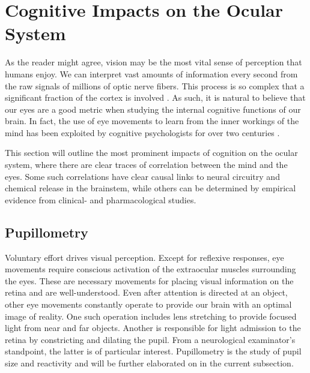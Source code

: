 \section{Cognitive Impacts on the Ocular System} \label{sec:bt/cognitive_impacts}

As the reader might agree, vision may be the most vital sense of perception that humans enjoy. We can interpret vast amounts of information every second from the raw signals of millions of optic nerve fibers. This process is so complex that a significant fraction of the cortex is involved \cite{klatzky2012}. As such, it is natural to believe that our eyes are a good metric when studying the internal cognitive functions of our brain. In fact, the use of eye movements to learn from the inner workings of the mind has been exploited by cognitive psychologists for over two centuries \cite{wells1792}. 

This section will outline the most prominent impacts of cognition on the ocular system, where there are clear traces of correlation between the mind and the eyes. Some such correlations have clear causal links to neural circuitry and chemical release in the brainstem, while others can be determined by empirical evidence from clinical- and pharmacological studies.


\subsection{Pupillometry} \label{sec:bt/cognitive_impacts/pupillometry}

Voluntary effort drives visual perception. Except for reflexive responses, eye movements require conscious activation of the extraocular muscles surrounding the eyes. These are necessary movements for placing visual information on the retina and are well-understood. Even after attention is directed at an object, other eye movements constantly operate to provide our brain with an optimal image of reality. One such operation includes lens stretching to provide focused light from near and far objects. Another is responsible for light admission to the retina by constricting and dilating the pupil. From a neurological examinator's standpoint, the latter is of particular interest. Pupillometry is the study of pupil size and reactivity and will be further elaborated on in the current subsection.

